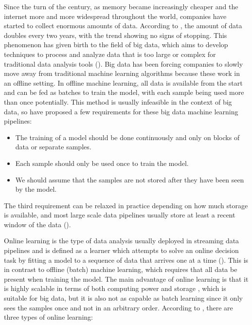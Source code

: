 \documentclass[12pt]{extreport}
\begin{document}
Since the turn of the century, as memory became increasingly cheaper and the internet more and more widespread throughout the world, companies have started to collect enormous amounts of data. According to \cite{big-data-beginning-future}, the amount of data doubles every two years, with the trend showing no signs of stopping. This phenomenon has given birth to the field of big data, which aims to develop techniques to process and analyze data that is too large or complex for traditional data analysis tools (\cite{wiki:big-data}). Big data has been forcing companies to slowly move away from traditional machine learning algorithms because these work in an offline setting. In offline machine learning, all data is available from the start and can be fed as batches to train the model, with each sample being used more than once potentially. This method is usually infeasible in the context of big data, so \cite{advances-knowledge-discovery} have proposed a few requirements for these big data machine learning pipelines:

\begin{itemize}
    \item The training of a model should be done continuously and only on blocks of data or separate samples.
    \item Each sample should only be used once to train the model.
    \item We should assume that the samples are not stored after they have been seen by the model.
\end{itemize}

The third requirement can be relaxed in practice depending on how much storage is available, and most large scale data pipelines usually store at least a recent window of the data (\cite{adwin}).

Online learning is the type of data analysis usually deployed in streaming data pipelines and is defined as a learner which attempts to solve an online decision task by fitting a model to a sequence of data that arrives one at a time (\cite{onlinelearning}). This is in contrast to offline (batch) machine learning, which requires that all data be present when training the model. The main advantage of online learning is that it is highly scalable in terms of both computing power and storage \cite{sagemaker}, which is suitable for big data, but it is also not as capable as batch learning since it only sees the samples once and not in an arbitrary order. According to \cite{onlinelearning}, there are three types of online learning:
\end{document}
